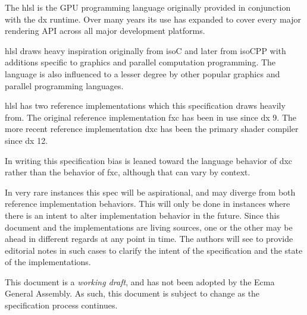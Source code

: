 
\p The \acrfull{hlsl} is the GPU programming language originally provided in
conjunction with the \gls{dx} runtime. Over many years its use has expanded to
cover every major rendering API across all major development platforms.

\p \acrshort{hlsl} draws heavy inspiration originally from \gls{isoC} and later
from \gls{isoCPP} with additions specific to graphics and parallel computation
programming. The language is also influenced to a lesser degree by other popular
graphics and parallel programming languages.

\p \acrshort{hlsl} has two reference implementations which this specification
draws heavily from. The original reference implementation \acrfull{fxc} has been
in use since \gls{dx} 9. The more recent reference implementation \acrfull{dxc}
has been the primary shader compiler since \gls{dx} 12.

\p In writing this specification bias is leaned toward the language
behavior of \acrshort{dxc} rather than the behavior of \acrshort{fxc}, although
that can vary by context.

\p In very rare instances this spec will be aspirational, and may diverge from
both reference implementation behaviors. This will only be done in instances
where there is an intent to alter implementation behavior in the future. Since
this document and the implementations are living sources, one or the other may
be ahead in different regards at any point in time. The authors will see to
provide editorial notes in such cases to clarify the intent of the specification
and the state of the implementations.

\p This document is a \textit{working draft}, and has not been adopted by the
Ecma General Assembly. As such, this document is subject to change as the
specification process continues.

